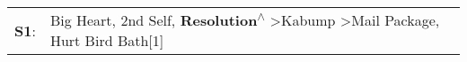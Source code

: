 \begin{supertabular}{p{0.03\textwidth}p{0.92\textwidth}}
 \textbf{S1}:  &  Big Heart\textsuperscript{}, \enspace 2nd Self\textsuperscript{}, \enspace \textbf{Resolution\textsuperscript{$\wedge$}} \textgreater \enspace Kabump\textsuperscript{} \textgreater \enspace Mail Package\textsuperscript{}, \enspace Hurt Bird Bath[1]\textsuperscript{}  \enspace  \\
\end{supertabular}
